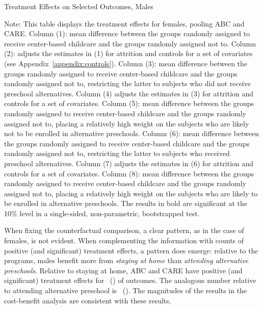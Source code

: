 \begin{table}[H] 
\begin{threeparttable}
\caption{Treatment Effects on Selected Outcomes, Males}
\label{table:males}
\centering
\scalebox{.97}{ 
}
\begin{tablenotes}
\footnotesize
\item Note: This table displays the treatment effects for females, pooling ABC and CARE. Column (1): mean difference between the groups randomly assigned to receive center-based childcare and the groups randomly assigned not to. Column (2): adjusts the estimates in (1) for attrition and controls for a set of covariates (see Appendix~\ref{appendix:controls}). Column (3): mean difference between the groups randomly assigned to receive center-based childcare and the groups randomly assigned not to, restricting the latter to subjects who did not receive preschool alternatives. Column (4) adjusts the estimates in (3) for attrition and controls for a set of covariates. Column (5): mean difference between the groups randomly assigned to receive center-based childcare and the groups randomly assigned not to, placing a relatively high weight on the subjects who are likely not to be enrolled in alternative preschools. Column (6): mean difference between the groups randomly assigned to receive center-based childcare and the groups randomly assigned not to, restricting the latter to subjects who received preschool alternatives. Column (7) adjusts the estimates in (6) for attrition and controls for a set of covariates. Column (8): mean difference between the groups randomly assigned to receive center-based childcare and the groups randomly assigned not to, placing a relatively high weight on the subjects who are likely to be enrolled in alternative preschools. The results in bold are significant at the 10\% level in a single-sided, non-parametric, bootstrapped test.
\end{tablenotes}
\end{threeparttable}
\end{table}

\noindent When fixing the counterfactual comparison, a clear pattern, as in the case of females, is not evident. When complementing the information with counts of positive (and significant) treatment effects, a pattern does emerge: relative to the programs, males benefit more from \textit{staying at home} than \textit{attending alternative preschools}. Relative to staying at home, ABC and CARE have positive (and significant) treatment effects for \positivecsnm\ (\positivescsnm) of outcomes. The analogous number relative to attending alternative preschool is \positivecsam\ (\positivescsam). The magnitudes of the results in the cost-benefit analysis are  consistent with these results.


